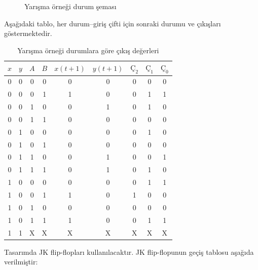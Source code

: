 \begin{ornek}[B.17]
\begin{figure}[H]
\caption*{Yarışma örneği durum şeması}
\end{figure}

Aşağıdaki tablo, her durum--giriş çifti için sonraki durumu ve çıkışları göstermektedir.

\begin{table}[H]
\centering
\caption*{Yarışma örneği durumlara göre çıkış değerleri}
\small
\begin{tabular}{cccc|cc|ccc}
\toprule
$x$ & $y$ & $A$ & $B$ & $x(t+1)$ & $y(t+1)$ & $\text{Ç}_2$ & $\text{Ç}_1$ & $\text{Ç}_0$ \\
\midrule
0 & 0 & 0 & 0 & 0 & 0 & 0 & 0 & 0 \\
0 & 0 & 0 & 1 & 1 & 0 & 0 & 1 & 1 \\
0 & 0 & 1 & 0 & 0 & 1 & 0 & 1 & 0 \\
0 & 0 & 1 & 1 & 0 & 0 & 0 & 0 & 0 \\
0 & 1 & 0 & 0 & 0 & 0 & 0 & 1 & 0 \\
0 & 1 & 0 & 1 & 0 & 0 & 0 & 0 & 0 \\
0 & 1 & 1 & 0 & 0 & 1 & 0 & 0 & 1 \\
0 & 1 & 1 & 1 & 0 & 1 & 0 & 1 & 0 \\
1 & 0 & 0 & 0 & 0 & 0 & 0 & 1 & 1 \\
1 & 0 & 0 & 1 & 1 & 0 & 1 & 0 & 0 \\
1 & 0 & 1 & 0 & 0 & 0 & 0 & 0 & 0 \\
1 & 0 & 1 & 1 & 1 & 0 & 0 & 1 & 1 \\
1 & 1 & X & X & X & X & X & X & X \\
\bottomrule
\end{tabular}
\end{table}

Tasarımda JK flip-flopları kullanılacaktır. JK flip-flopunun geçiş tablosu aşağıda verilmiştir:


\end{ornek}
